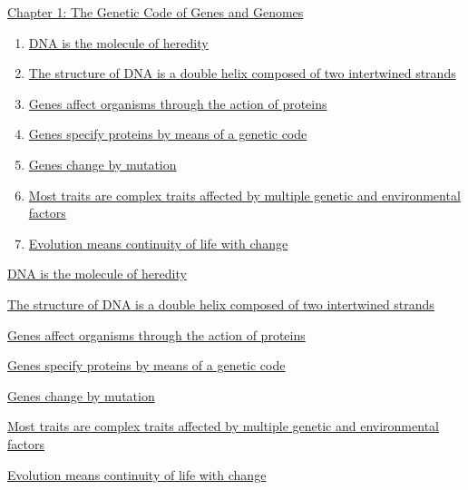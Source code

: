 \documentclass[12pt,letterpaper]{article}
\newcommand{\thetitle}{\hypertarget{home}{Essential Genetics and Genomics}}
\begin{document}
\clearpage

\renewcommand{\thetitle}{\hypertarget{1}{The Genetic Code of Genes
and Genomes}}
\hypertarget{1}{} 

\begin{chapbox}{\hyperlink{home}{Chapter 1: The Genetic Code of Genes
    and Genomes}}
    \begin{enumerate}
        \item \hyperlink{1.1}{DNA is the molecule of heredity}
        \item \hyperlink{1.2}{The structure of DNA is a double helix composed of two intertwined strands}
        \item \hyperlink{1.3}{Genes affect organisms through the action of proteins}
        \item \hyperlink{1.4}{Genes specify proteins by means of a genetic code}
        \item \hyperlink{1.5}{Genes change by mutation}
        \item \hyperlink{1.6}{Most traits are complex traits affected by multiple genetic and environmental factors}
        \item \hyperlink{1.7}{Evolution means continuity of life with change}
    \end{enumerate}
\end{chapbox}


\hypertarget{1.1}{}
\begin{secbox}{\hyperlink{1}{DNA is the molecule of heredity}}{

}\end{secbox}
\hypertarget{1.2}{}
\begin{secbox}{\hyperlink{1}{The structure of DNA is a double helix composed of two intertwined strands}}{

}\end{secbox}
\hypertarget{1.3}{}
\begin{secbox}{\hyperlink{1}{Genes affect organisms through the action of proteins}}{

}\end{secbox}
\hypertarget{1.4}{}
\begin{secbox}{\hyperlink{1}{Genes specify proteins by means of a genetic code}}{

}\end{secbox}
\hypertarget{1.5}{}
\begin{secbox}{\hyperlink{1}{Genes change by mutation}}{

}\end{secbox}
\hypertarget{1.6}{}
\begin{secbox}{\hyperlink{1}{Most traits are complex traits affected by multiple genetic and environmental factors}}{

}\end{secbox}
\hypertarget{1.7}{}
\begin{secbox}{\hyperlink{1}{Evolution means continuity of life with change}}{

}\end{secbox}
\end{document}
